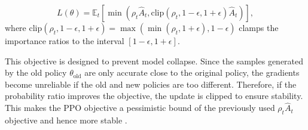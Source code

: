 \begin{equation}
    L(\theta) = \mathbb{E}_t[\min(\rho_t\hat{A}_t, \text{clip}(\rho_t, 1 - \epsilon, 1 + \epsilon)\hat{A}_t)],
    \label{eq:PPO loss}
\end{equation}
where $\text{clip}(\rho_t, 1 - \epsilon, 1 + \epsilon) = \max(\min(\rho_t, 1 + \epsilon), 1 - \epsilon)$ clamps the importance ratios to the interval $[1 - \epsilon, 1 + \epsilon]$.

This objective is designed to prevent model collapse. Since the samples generated by the old policy $\theta_\text{old}$ are only accurate close to the original policy, the gradients become unreliable if the old and new policies are too different. Therefore, if the probability ratio improves the objective, the update is clipped to ensure stability. This makes the PPO objective a pessimistic bound of the previously used $\rho_t\hat{A}_t$ objective and hence more stable \cite{schulman2017proximalpolicyoptimizationalgorithms}.




